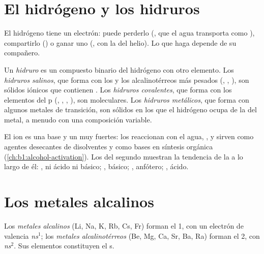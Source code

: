 \section{El hidrógeno y los hidruros}

El hidrógeno tiene un electrón: puede perderlo (, que el agua
transporta como ), compartirlo () o ganar uno
(, con la  del helio). Lo que haga depende
de su compañero.

\begin{definition}[Hidruros]\label{def:b1:s-block:hydride}
Un \emph{hidruro} es un compuesto binario del hidrógeno con
otro elemento. Los \emph{hidruros salinos}, que
forma con los  y los alcalinotérreos más pesados
(, , ), son sólidos iónicos que contienen
. Los \emph{hidruros covalentes}, que
forma con los elementos del  p (, , ,
), son moleculares. Los \emph{hidruros metálicos}, que
forma con algunos metales de transición, son sólidos en los que el
hidrógeno ocupa  de la  del metal, a menudo con
una composición variable.
\end{definition}

El ion  es una base y un  muy fuertes: los  reaccionan con el agua, , y sirven
como agentes desecantes de disolventes y como bases en síntesis orgánica
(\cref{ch:b1:alcohol-activation}). Los  del segundo
 muestran la tendencia de la  a lo largo de él:
, ni ácido ni básico; , básico; , anfótero;
, ácido.

\section{Los metales alcalinos}

\begin{definition}\label{def:b1:s-block:families}
Los \emph{metales alcalinos} (Li, Na, K, Rb, Cs, Fr)
forman el  1, con un electrón de valencia \textit{ns}$^1$; los
\emph{metales alcalinotérreos} (Be, Mg, Ca, Sr,
Ba, Ra) forman el  2, con \textit{ns}$^2$. Sus elementos constituyen
el  s.
\end{definition}

